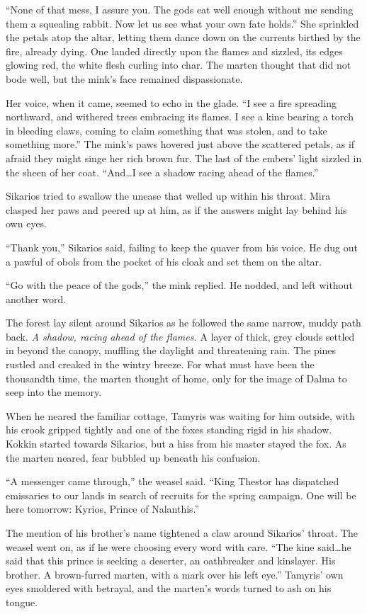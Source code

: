 ``None of that mess, I assure you. The gods eat well enough without me sending them a squealing rabbit. Now let us see what your own fate holds.'' She sprinkled the petals atop the altar, letting them dance down on the currents birthed by the fire, already dying. One landed directly upon the flames and sizzled, its edges glowing red, the white flesh curling into char. The marten thought that did not bode well, but the mink's face remained dispassionate.

Her voice, when it came, seemed to echo in the glade. ``I see a fire spreading northward, and withered trees embracing its flames. I see a kine bearing a torch in bleeding claws, coming to claim something that was stolen, and to take something more.'' The mink's paws hovered just above the scattered petals, as if afraid they might singe her rich brown fur. The last of the embers' light sizzled in the sheen of her coat. ``And\ldots{}I see a shadow racing ahead of the flames.''

Sikarios tried to swallow the unease that welled up within his throat. Mira clasped her paws and peered up at him, as if the answers might lay behind his own eyes.

``Thank you,'' Sikarios said, failing to keep the quaver from his voice. He dug out a pawful of obols from the pocket of his cloak and set them on the altar.

``Go with the peace of the gods,'' the mink replied. He nodded, and left without another word.

The forest lay silent around Sikarios as he followed the same narrow, muddy path back. \emph{A shadow, racing ahead of the flames.} A layer of thick, grey clouds settled in beyond the canopy, muffling the daylight and threatening rain. The pines rustled and creaked in the wintry breeze. For what must have been the thousandth time, the marten thought of home, only for the image of Dalma to seep into the memory.

When he neared the familiar cottage, Tamyris was waiting for him outside, with his crook gripped tightly and one of the foxes standing rigid in his shadow. Kokkin started towards Sikarios, but a hiss from his master stayed the fox. As the marten neared, fear bubbled up beneath his confusion.

``A messenger came through,'' the weasel said. ``King Thestor has dispatched emissaries to our lands in search of recruits for the spring campaign. One will be here tomorrow: Kyrios, Prince of Nalanthis.''

The mention of his brother's name tightened a claw around Sikarios' throat. The weasel went on, as if he were choosing every word with care. ``The kine said\ldots{}he said that this prince is seeking a deserter, an oathbreaker and kinslayer. His brother. A brown-furred marten, with a mark over his left eye.'' Tamyris' own eyes smoldered with betrayal, and the marten's words turned to ash on his tongue.

